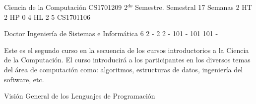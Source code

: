 \documentclass[a4paper,8pt]{article}
\begin{document}
\setNombreProfesor{}
\setGradoProfesorAbreviado{}
\sylabusHeader

\academicaTable
{Ciencia de la Computación} %
{CS1701209} %
{2$^{do}$ Semestre.} %
{Semestral} %
{17 Semanas} %
{2 HT} %
{2 HP} %
{0} %
{4 HL}  %
{2} %
{5} %
{CS1701106} %

\administrativaTable
{Doctor} %
{Ingeniería de Sistemas e Informática} %
{6} %
{2} %
{-} %
{2} %
{2} %
{-} %
{101} %
{-} %
{101} %
{101} %
{-} %


\begin{fundamentacion}
Este es el segundo curso en la secuencia de los cursos introductorios a la Ciencia de la Computación.
El curso introducirá a los participantes en los diversos temas del área de computación como: algoritmos, estructuras de datos, ingeniería del software, etc.

\end{fundamentacion}

\begin{sumilla}
\item Visión General de los Lenguajes de Programación
\item \OSVirtualMachines
\item \PLBasicTypeSystems
\item \SDFFundamentalProgrammingConcepts
\item \PLObjectOrientedProgramming
\item \SDFAlgorithmsandDesign
\item \ALAlgorithmicStrategies
\item \ALBasicAnalysis
\item \ALFundamentalDataStructuresandAlgorithms

\end{sumilla}

\begin{competenciasAsignatura}
\item {}
\item {}
\item {}
\item {}

\end{competenciasAsignatura}
\end{document}
